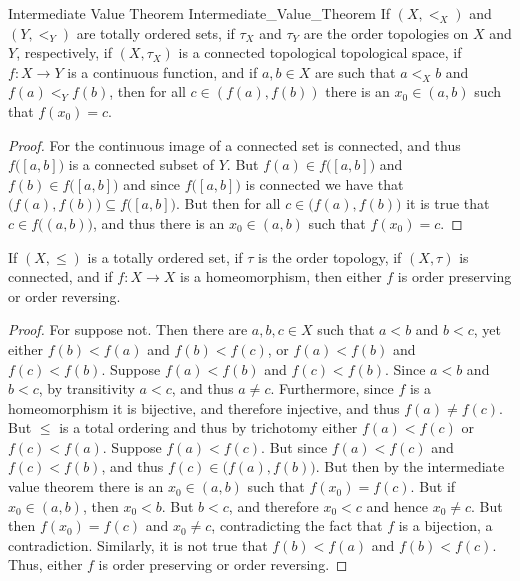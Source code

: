 \documentclass{article}                                                        %
\begin{document}
        \begin{ltheorem}{Intermediate Value Theorem}
                            {Intermediate_Value_Theorem}
                If $(X,<_{X})$ and $(Y,<_{Y})$ are totally ordered sets, if
                $\tau_{X}$ and $\tau_{Y}$ are the order topologies on $X$ and
                $Y$, respectively, if $(X,\tau_{X})$ is a connected topological
                topological space, if $f:X\rightarrow{Y}$ is a continuous
                function, and if $a,b\in{X}$ are such that $a<_{X}b$ and
                $f(a)<_{Y}f(b)$, then for all $c\in(f(a),f(b))$ there is an
                $x_{0}\in(a,b)$ such that $f(x_{0})=c$.
        \end{ltheorem}
        \begin{proof}
                For the continuous image of a connected set is connected, and
                thus $f\big([a,b]\big)$ is a connected subset of $Y$. But
                $f(a)\in{f}\big([a,b]\big)$ and $f(b)\in{f}\big([a,b]\big)$ and
                since $f\big([a,b]\big)$ is connected we have that
                $\big(f(a),f(b)\big)\subseteq{f}\big([a,b]\big)$. But then for
                all $c\in\big(f(a),f(b)\big)$ it is true that
                $c\in{f}\big((a,b)\big)$, and thus there is an $x_{0}\in(a,b)$
                such that $f(x_{0})=c$.
        \end{proof}
        \begin{theorem}
                If $(X,\leq)$ is a totally ordered set, if $\tau$ is the order
                topology, if $(X,\tau)$ is connected, and if $f:X\rightarrow{X}$
                is a homeomorphism, then either $f$ is order preserving or
                order reversing.
        \end{theorem}
        \begin{proof}
                For suppose not. Then there are $a,b,c\in{X}$ such that
                $a<b$ and $b<c$, yet either $f(b)<f(a)$ and $f(b)<f(c)$, or
                $f(a)<f(b)$ and $f(c)<f(b)$. Suppose $f(a)<f(b)$ and
                $f(c)<f(b)$. Since $a<b$ and $b<c$, by transitivity $a<c$, and
                thus $a\ne{c}$. Furthermore, since $f$ is a homeomorphism it is
                bijective, and therefore injective, and thus $f(a)\ne{f}(c)$.
                But $\leq$ is a total ordering and thus by trichotomy either
                $f(a)<f(c)$ or $f(c)<f(a)$. Suppose $f(a)<f(c)$. But since
                $f(a)<f(c)$ and $f(c)<f(b)$, and thus
                $f(c)\in\big(f(a),f(b)\big)$. But then by the intermediate value
                theorem there is an $x_{0}\in(a,b)$ such that $f(x_{0})=f(c)$.
                But if $x_{0}\in(a,b)$, then $x_{0}<b$. But $b<c$, and therefore
                $x_{0}<c$ and hence $x_{0}\ne{c}$. But then $f(x_{0})=f(c)$ and
                $x_{0}\ne{c}$, contradicting the fact that $f$ is a bijection,
                a contradiction. Similarly, it is not true that $f(b)<f(a)$ and
                $f(b)<f(c)$. Thus, either $f$ is order preserving or order
                reversing.
        \end{proof}
\end{document}

